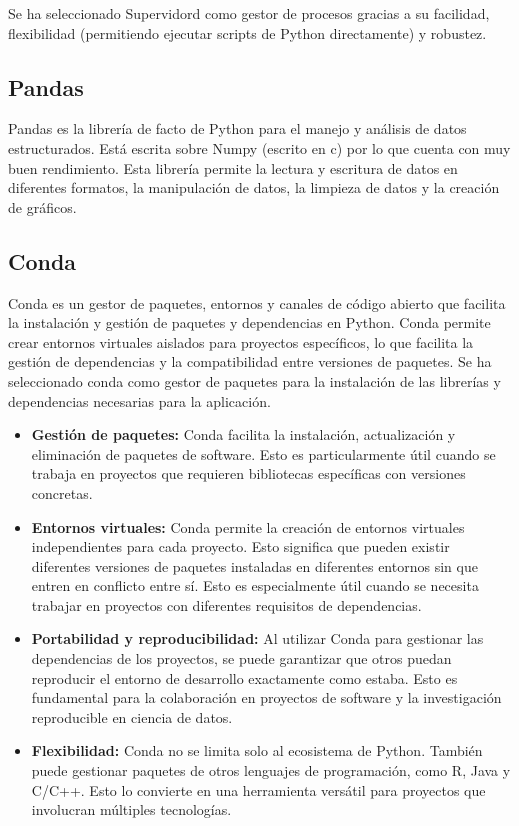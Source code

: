 Se ha seleccionado Supervidord como gestor de procesos gracias a su facilidad, flexibilidad (permitiendo ejecutar scripts de Python directamente) y robustez.

\subsection*{Pandas}
Pandas es la librería de facto de Python para el manejo y análisis de datos estructurados. Está escrita sobre Numpy (escrito en c) por lo que cuenta con muy buen rendimiento. Esta librería permite la lectura y escritura de datos en diferentes formatos, la manipulación de datos, la limpieza de datos y la creación de gráficos.

\subsection*{Conda}
Conda es un gestor de paquetes, entornos y canales de código abierto que facilita la instalación y gestión de paquetes y dependencias en Python. Conda permite crear entornos virtuales aislados para proyectos específicos, lo que facilita la gestión de dependencias y la compatibilidad entre versiones de paquetes. Se ha seleccionado conda como gestor de paquetes para la instalación de las librerías y dependencias necesarias para la aplicación.

\begin{itemize}
	\item \textbf{Gestión de paquetes:} Conda facilita la instalación, actualización y eliminación de paquetes de software. Esto es particularmente útil cuando se trabaja en proyectos que requieren bibliotecas específicas con versiones concretas.

	\item \textbf{Entornos virtuales:} Conda permite la creación de entornos virtuales independientes para cada proyecto. Esto significa que pueden existir diferentes versiones de paquetes instaladas en diferentes entornos sin que entren en conflicto entre sí. Esto es especialmente útil cuando se necesita trabajar en proyectos con diferentes requisitos de dependencias.

	\item \textbf{Portabilidad y reproducibilidad:} Al utilizar Conda para gestionar las dependencias de los proyectos, se puede garantizar que otros puedan reproducir el entorno de desarrollo exactamente como estaba. Esto es fundamental para la colaboración en proyectos de software y la investigación reproducible en ciencia de datos.

	\item \textbf{Flexibilidad:} Conda no se limita solo al ecosistema de Python. También puede gestionar paquetes de otros lenguajes de programación, como R, Java y C/C++. Esto lo convierte en una herramienta versátil para proyectos que involucran múltiples tecnologías.
\end{itemize}


